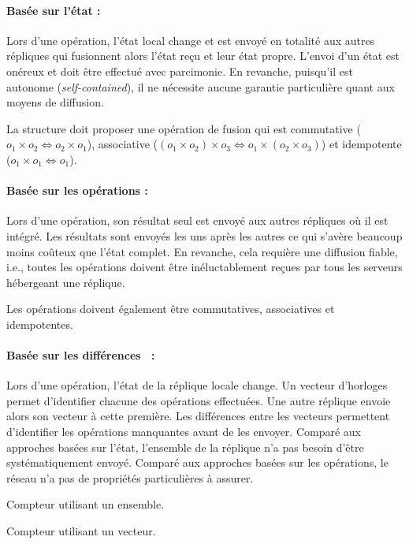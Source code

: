 \paragraph{Basée sur l'état :} Lors d'une opération, l'état local change et est
envoyé en totalité aux autres répliques qui fusionnent alors l'état reçu et leur
état propre. L'envoi d'un état est onéreux et doit être effectué avec
parcimonie. En revanche, puisqu'il est autonome (\emph{self-contained}), il ne
nécessite aucune garantie particulière quant aux moyens de diffusion.

\noindent La structure doit proposer une opération de fusion qui est commutative
($o_1 \times o_2 \Leftrightarrow o_2 \times o_1$), associative
($(o_1 \times o_2) \times o_3 \Leftrightarrow o_1 \times (o_2 \times o_3)$) et
idempotente ($o_1 \times o_1 \Leftrightarrow o_1$).

\paragraph{Basée sur les opérations :} Lors d'une opération, son résultat seul
est envoyé aux autres répliques où il est intégré. Les résultats sont envoyés
les uns après les autres ce qui s'avère beaucoup moins coûteux que l'état
complet. En revanche, cela requière une diffusion fiable, i.e., toutes les
opérations doivent être inéluctablement reçues par tous les serveurs hébergeant
une réplique.

\noindent Les opérations doivent également être commutatives, associatives et
idempotentes.

\paragraph{Basée sur les différences~\cite{vanderlinde2016delta} :} Lors d'une
opération, l'état de la réplique locale change. Un vecteur d'horloges permet
d'identifier chacune des opérations effectuées. Une autre réplique envoie alors
son vecteur à cette première. Les différences entre les vecteurs permettent
d'identifier les opérations manquantes avant de les envoyer. Comparé aux
approches basées sur l'état, l'ensemble de la réplique n'a pas besoin d'être
systématiquement envoyé. Comparé aux approches basées sur les opérations, le
réseau n'a pas de propriétés particulières à assurer.

{\noindent%
\begin{minipage}[t]{0.48\textwidth}
  \begin{algorithm}[H]
    
    \caption[Compteur utilisant un ensemble]
    {\label{repl:algo:counterA} Compteur utilisant un ensemble.}
  \end{algorithm}
\end{minipage}%
\hfill%
\begin{minipage}[t]{0.48\textwidth}
  \begin{algorithm}[H]
    
    \caption[Compteur utilisant un vecteur]
    {\label{repl:algo:counterB} Compteur utilisant un vecteur.}
  \end{algorithm}
\end{minipage}
} \\


